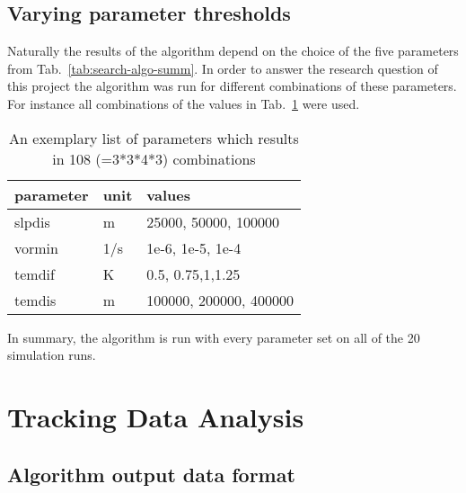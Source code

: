 \subsection{Varying parameter thresholds}
Naturally the results of the algorithm depend on the choice of the five
parameters from Tab.~\ref{tab:search-algo-summ}. In order to answer the
research question of this project the algorithm was run for different
combinations of these parameters. For instance all combinations of the values
in Tab.~\ref{tab:param_combos} were used.

\begin{table}[ht]
	\centering
	\begin{tabular}{|l|l|l|}
		\hline
		\textbf{parameter} & \textbf{unit} & \textbf{values}        \\ \hline
		slpdis             & m             & 25000, 50000, 100000   \\
		vormin             & 1/s           & 1e-6, 1e-5, 1e-4       \\
		temdif             & K             & 0.5, 0.75,1,1.25       \\
		temdis             & m             & 100000, 200000, 400000 \\ \hline
	\end{tabular}
	\caption{An exemplary list of parameters which results in 108 (=3*3*4*3) combinations }
	\label{tab:param_combos}
\end{table}
In summary, the algorithm is run with every parameter set on all of the 20
simulation runs.

\section{Tracking Data Analysis}
\subsection{Algorithm output data format}

